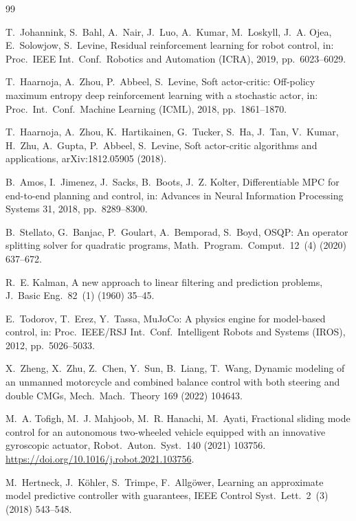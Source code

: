 \documentclass[preprint,12pt,authoryear=false]{elsarticle}
\theoremstyle{remark}\newtheorem{remark}{Remark}
\theoremstyle{plain}\newtheorem{proposition}{Proposition}\newtheorem{lemma}{Lemma}
\theoremstyle{definition}\newtheorem{assumption}{Assumption}
\begin{document}
\begin{thebibliography}{99}\small

T.~Johannink, S.~Bahl, A.~Nair, J.~Luo, A.~Kumar, M.~Loskyll, J.~A. Ojea, E.~Solowjow, S.~Levine,
Residual reinforcement learning for robot control,
in: Proc.\ IEEE Int.\ Conf.\ Robotics and Automation (ICRA), 2019, pp.~6023--6029.

T.~Haarnoja, A.~Zhou, P.~Abbeel, S.~Levine,
Soft actor-critic: Off-policy maximum entropy deep reinforcement learning with a stochastic actor,
in: Proc.\ Int.\ Conf.\ Machine Learning (ICML), 2018, pp.~1861--1870.

T.~Haarnoja, A.~Zhou, K.~Hartikainen, G.~Tucker, S.~Ha, J.~Tan, V.~Kumar, H.~Zhu, A.~Gupta, P.~Abbeel, S.~Levine,
Soft actor-critic algorithms and applications,
arXiv:1812.05905 (2018).

B.~Amos, I.~Jimenez, J.~Sacks, B.~Boots, J.~Z. Kolter,
Differentiable MPC for end-to-end planning and control,
in: Advances in Neural Information Processing Systems 31, 2018, pp.~8289--8300.

B.~Stellato, G.~Banjac, P.~Goulart, A.~Bemporad, S.~Boyd,
OSQP: An operator splitting solver for quadratic programs,
Math.\ Program.\ Comput.\ 12~(4) (2020) 637--672.

R.~E. Kalman,
A new approach to linear filtering and prediction problems,
J.\ Basic Eng.\ 82~(1) (1960) 35--45.

E.~Todorov, T.~Erez, Y.~Tassa,
MuJoCo: A physics engine for model-based control,
in: Proc.\ IEEE/RSJ Int.\ Conf.\ Intelligent Robots and Systems (IROS), 2012, pp.~5026--5033.

X.~Zheng, X.~Zhu, Z.~Chen, Y.~Sun, B.~Liang, T.~Wang,
Dynamic modeling of an unmanned motorcycle and combined balance control with both steering and double CMGs,
Mech.\ Mach.\ Theory 169 (2022) 104643.

M.~A. Tofigh, M.~J. Mahjoob, M.~R. Hanachi, M.~Ayati,
Fractional sliding mode control for an autonomous two-wheeled vehicle equipped with an innovative gyroscopic actuator,
Robot.\ Auton.\ Syst.\ 140 (2021) 103756.
\url{https://doi.org/10.1016/j.robot.2021.103756}.

M.~Hertneck, J.~K{\"o}hler, S.~Trimpe, F.~Allg{\"o}wer,
Learning an approximate model predictive controller with guarantees,
IEEE Control Syst.\ Lett.\ 2~(3) (2018) 543--548.


\end{thebibliography}
\end{document}
